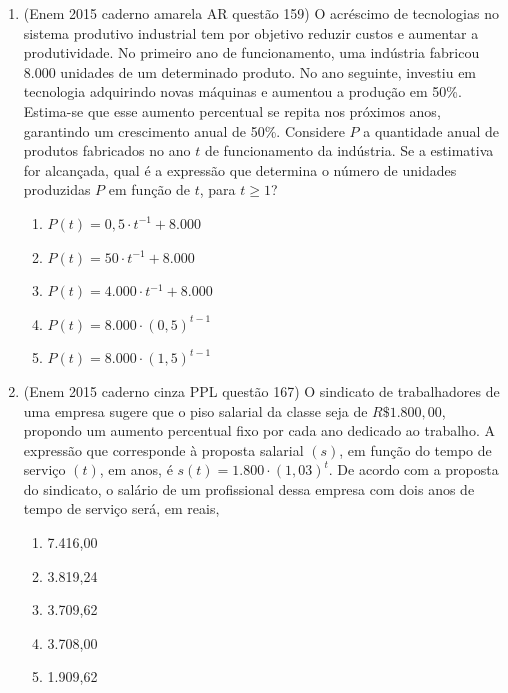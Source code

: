 \begin{enumerate}
	\item (Enem 2015 caderno amarela AR questão 159) O acréscimo de tecnologias no sistema produtivo industrial tem por objetivo reduzir custos e aumentar a produtividade. No primeiro ano de funcionamento, uma indústria fabricou 8.000 unidades de um determinado produto. No ano seguinte, investiu em tecnologia adquirindo novas máquinas e aumentou a produção em 50\%. Estima-se que esse aumento percentual se repita nos próximos anos, garantindo um crescimento anual de 50\%. Considere $ P $ a quantidade anual de produtos fabricados no ano $ t $ de funcionamento da indústria.
	Se a estimativa for alcançada, qual é a expressão que determina o número de unidades produzidas $ P $ em função de $ t $, para $ t\ge 1 $?
	\begin{enumerate}
		\item $ P(t)=0,5\cdot t^{-1}+8.000 $
		\item $ P(t)=50\cdot t^{-1}+8.000 $
		\item $ P(t)=4.000\cdot t^{-1}+8.000 $
		\item $ P(t)=8.000\cdot (0,5)^{t-1} $
		\item $ P(t)=8.000\cdot (1,5)^{t-1} $
	\end{enumerate}
	
	\item (Enem 2015 caderno cinza PPL questão 167) O sindicato de trabalhadores de uma empresa sugere que o piso salarial da classe seja de $ R\$ 1.800,00 $, propondo um aumento percentual fixo por cada ano dedicado ao trabalho. A expressão que corresponde à proposta salarial $ (s) $, em função do tempo de serviço $ (t) $, em anos, é $ s(t)=1.800\cdot(1,03)^t $.
	De acordo com a proposta do sindicato, o salário de um profissional dessa empresa com dois anos de tempo de serviço será, em reais,
	\begin{enumerate}
		\item 7.416,00
		\item 3.819,24
		\item 3.709,62
		\item 3.708,00
		\item 1.909,62
	\end{enumerate}
	

\end{enumerate}
